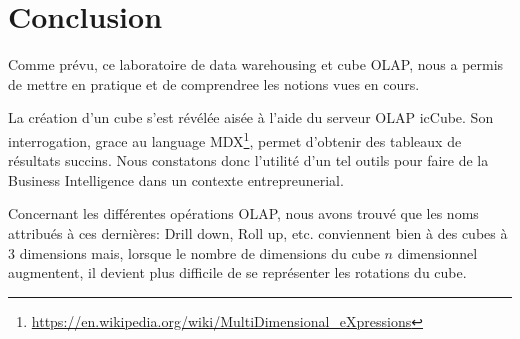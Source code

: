 
\chapter{Conclusion}

Comme prévu, ce laboratoire de data warehousing et cube OLAP, nous a permis de mettre en pratique et de comprendree les notions vues en cours.

La création d'un cube s'est révélée aisée à l'aide du serveur OLAP icCube. Son interrogation, grace au language MDX\footnote{\url{https://en.wikipedia.org/wiki/MultiDimensional_eXpressions}}, permet d'obtenir des tableaux de résultats succins. Nous constatons donc l'utilité d'un tel outils pour faire de la Business Intelligence dans un contexte entrepreunerial. 

Concernant les différentes opérations OLAP, nous avons trouvé que les noms attribués à ces dernières: Drill down, Roll up, etc. conviennent bien à des cubes à 3 dimensions mais, lorsque le nombre de dimensions du cube $n$ dimensionnel augmentent, il devient plus difficile de se représenter les rotations du cube.